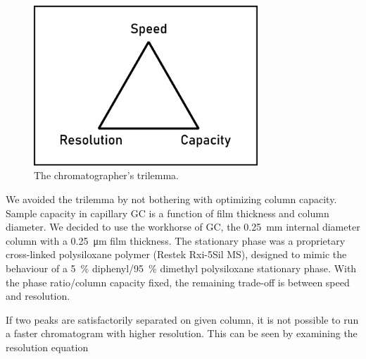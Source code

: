 \begin{figure}
\centering
\includegraphics[width=0.75\textwidth]{Figures/Triangle.pdf}
\decoRule
\caption[Schematic diagram of a the chromatograher's trilemma.]{The chromatographer's trilemma.}
\label{fig:trilemma}
\end{figure}

We avoided the trilemma by not bothering with optimizing column capacity. Sample
capacity in capillary GC is a function of film thickness and column diameter. We
decided to use the workhorse of GC, the \SI{0.25}{\milli\metre} internal
diameter column with a \SI{0.25}{\micro\metre} film thickness. The stationary
phase was a proprietary cross-linked polysiloxane polymer (Restek
Rxi\textregistered{}-5Sil MS), designed to mimic the behaviour of a
\SI{5}{\percent} diphenyl/\SI{95}{\percent} dimethyl polysiloxane stationary
phase. With the phase ratio/column capacity fixed, the remaining trade-off is
between speed and resolution.



If two peaks are satisfactorily separated on given column, it is not possible to
run a faster chromatogram with higher resolution.  This can be seen by examining
the resolution equation \autocite{Sandra1989}

